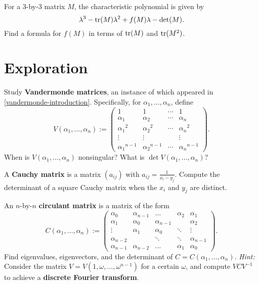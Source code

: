 \documentclass{homework}
\begin{document}
\begin{problem}
  For a $3$-by-$3$ matrix $M$, the characteristic polynomial is given by
  \[
    \lambda^3 - \operatorname{tr}(M) \lambda^2 + f(M) \lambda - \det(M).
  \]
  Find a formula for $f(M)$ in terms of $\operatorname{tr}(M)$ and $\operatorname{tr}(M^2)$.
\end{problem}

\section{Exploration}

\begin{problem}\label{vandermonde-determinant}Study \textbf{Vandermonde matrices}, an instance of which appeared in \ref{vandermonde-introduction}.  Specifically, for $\alpha_1,\ldots,\alpha_n$, define
  \[
    V(\alpha_1,\ldots,\alpha_n) := \begin{pmatrix}
      1 & 1 & \cdots & 1 \\
      \alpha_1 & \alpha_2 & \cdots & \alpha_n \\
      {\alpha_1}^2 & {\alpha_2}^2 & \cdots & {\alpha_n}^2 \\
      \vdots & \vdots  &  & \vdots \\
      {\alpha_1}^{n-1} & {\alpha_2}^{n-1} & \cdots & {\alpha_n}^{n-1}
    \end{pmatrix}.
  \]
  When is $V(\alpha_1,\ldots,\alpha_n)$ nonsingular?  What is $\det V(\alpha_1,\ldots,\alpha_n)$?
\end{problem}

\begin{problem}\label{cauchy-determinant}A \textbf{Cauchy matrix} is a matrix $(a_{ij})$ with $a_{ij} = \displaystyle\frac{1}{x_i - y_j}$.  Compute the determinant of a square Cauchy matrix when the $x_i$ and $y_j$ are distinct.
\end{problem}

\begin{problem}
  An $n$-by-$n$ \textbf{circulant matrix} is a matrix of the form
  \[
    C(\alpha_1,\ldots,\alpha_n) := {\begin{pmatrix}\alpha_{0}&\alpha_{n-1}&\dots &\alpha_{2}&\alpha_{1}\\\alpha_{1}&\alpha_{0}&\alpha_{n-1}&&\alpha_{2}\\\vdots &\alpha_{1}&\alpha_{0}&\ddots &\vdots \\\alpha_{n-2}&&\ddots &\ddots &\alpha_{n-1}\\\alpha_{n-1}&\alpha_{n-2}&\dots &\alpha_{1}&\alpha_{0}\end{pmatrix}.}
  \]
  Find eigenvalues, eigenvectors, and the determinant of
  $C = C(\alpha_1,\ldots,\alpha_n)$.  \textit{Hint:} Consider the matrix $V = V(1,\omega,\ldots,\omega^{n-1})$ for a certain $\omega$, and compute $VCV^{-1}$ to achieve a  \textbf{discrete Fourier transform}.
\end{problem}
\end{document}
